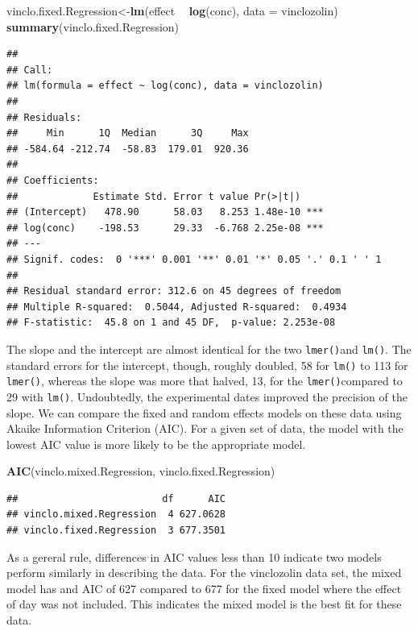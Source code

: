\documentclass[letterpaper,]{book}
\newenvironment{Shaded}{\begin{snugshade}}{\end{snugshade}}
\newcommand{\DataTypeTok}[1]{\textcolor[rgb]{0.13,0.29,0.53}{#1}}
\newcommand{\KeywordTok}[1]{\textcolor[rgb]{0.13,0.29,0.53}{\textbf{#1}}}
\newcommand{\NormalTok}[1]{#1}
\newcommand{\OperatorTok}[1]{\textcolor[rgb]{0.81,0.36,0.00}{\textbf{#1}}}
\newcommand{\StringTok}[1]{\textcolor[rgb]{0.31,0.60,0.02}{#1}}
\begin{document}
\begin{Shaded}
\begin{Highlighting}[]
\NormalTok{vinclo.fixed.Regression<-}\KeywordTok{lm}\NormalTok{(effect }\OperatorTok{~}\StringTok{ }\KeywordTok{log}\NormalTok{(conc), }\DataTypeTok{data =}\NormalTok{ vinclozolin)}
\KeywordTok{summary}\NormalTok{(vinclo.fixed.Regression)}
\end{Highlighting}
\end{Shaded}

\begin{verbatim}
## 
## Call:
## lm(formula = effect ~ log(conc), data = vinclozolin)
## 
## Residuals:
##     Min      1Q  Median      3Q     Max 
## -584.64 -212.74  -58.83  179.01  920.36 
## 
## Coefficients:
##             Estimate Std. Error t value Pr(>|t|)    
## (Intercept)   478.90      58.03   8.253 1.48e-10 ***
## log(conc)    -198.53      29.33  -6.768 2.25e-08 ***
## ---
## Signif. codes:  0 '***' 0.001 '**' 0.01 '*' 0.05 '.' 0.1 ' ' 1
## 
## Residual standard error: 312.6 on 45 degrees of freedom
## Multiple R-squared:  0.5044, Adjusted R-squared:  0.4934 
## F-statistic:  45.8 on 1 and 45 DF,  p-value: 2.253e-08
\end{verbatim}

The slope and the intercept are almost identical for the two \texttt{lmer()}and \texttt{lm()}. The standard errors for the intercept, though, roughly doubled, 58 for \texttt{lm()} to 113 for \texttt{lmer()}, whereas the slope was more that halved, 13, for the \texttt{lmer()}compared to 29 with \texttt{lm()}. Undoubtedly, the experimental dates improved the precision of the slope. We can compare the fixed and random effects models on these data using Akaike Information Criterion (AIC). For a given set of data, the model with the lowest AIC value is more likely to be the appropriate model.

\begin{Shaded}
\begin{Highlighting}[]
\KeywordTok{AIC}\NormalTok{(vinclo.mixed.Regression, vinclo.fixed.Regression)}
\end{Highlighting}
\end{Shaded}

\begin{verbatim}
##                         df      AIC
## vinclo.mixed.Regression  4 627.0628
## vinclo.fixed.Regression  3 677.3501
\end{verbatim}

As a gereral rule, differences in AIC values less than 10 indicate two models perform similarly in describing the data. For the vinclozolin data set, the mixed model has and AIC of 627 compared to 677 for the fixed model where the effect of day was not included. This indicates the mixed model is the best fit for these data.
\end{document}
